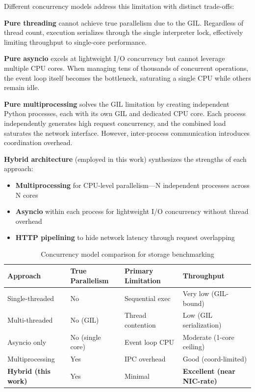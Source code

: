 Different concurrency models address this limitation with distinct trade-offs:

\textbf{Pure threading} cannot achieve true parallelism due to the GIL. Regardless of thread count, execution serializes through the single interpreter lock, effectively limiting throughput to single-core performance.

\textbf{Pure asyncio} excels at lightweight I/O concurrency but cannot leverage multiple CPU cores. When managing tens of thousands of concurrent operations, the event loop itself becomes the bottleneck, saturating a single CPU while others remain idle.

\textbf{Pure multiprocessing} solves the GIL limitation by creating independent Python processes, each with its own GIL and dedicated CPU core. Each process independently generates high request concurrency, and the combined load saturates the network interface. However, inter-process communication introduces coordination overhead.

\textbf{Hybrid architecture} (employed in this work) synthesizes the strengths of each approach:

\begin{itemize}
    \item \textbf{Multiprocessing} for CPU-level parallelism—N independent processes across N cores
    \item \textbf{Asyncio} within each process for lightweight I/O concurrency without thread overhead
    \item \textbf{HTTP pipelining} to hide network latency through request overlapping
\end{itemize}

\begin{table}[H]
\centering
\small
\caption{Concurrency model comparison for storage benchmarking}
\label{tab:concurrency-comparison}
\begin{tabular}{p{3cm}p{3cm}p{4cm}p{4cm}}
\hline
\textbf{Approach} & \textbf{True Parallelism} & \textbf{Primary Limitation} & \textbf{Throughput} \\
\hline
Single-threaded & No & Sequential exec & Very low (GIL-bound) \\
Multi-threaded & No (GIL) & Thread contention & Low (GIL serialization) \\
Asyncio only & No (single core) & Event loop CPU & Moderate (1-core ceiling) \\
Multiprocessing & Yes & IPC overhead & Good (coord-limited) \\
\textbf{Hybrid (this work)} & Yes & Minimal & \textbf{Excellent (near NIC-rate)} \\
\hline
\end{tabular}
\end{table}

